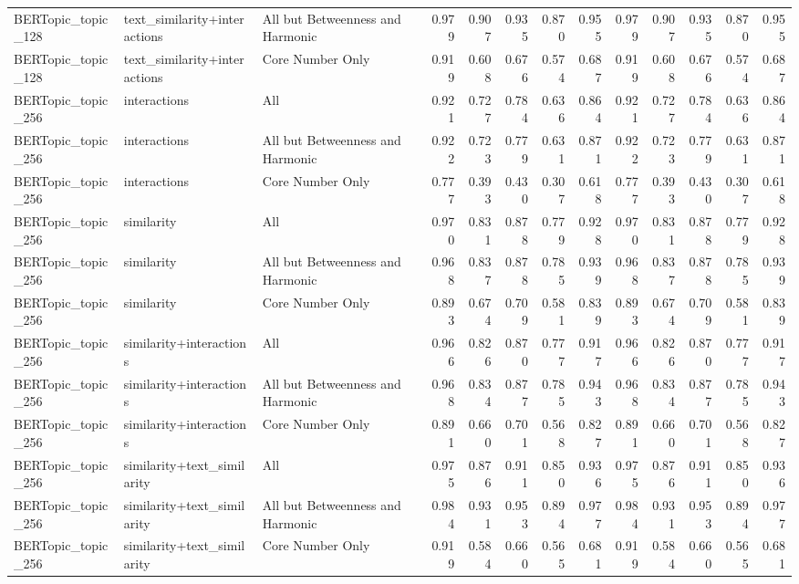\begin{tabular}{lllrrrrrrrrrr}
BERTopic\_topic\_128 & text\_similarity+interactions & All but Betweenness and Harmonic & 0.979 & 0.907 & 0.935 & 0.870 & 0.955 & 0.979 & 0.907 & 0.935 & 0.870 & 0.955 \\
BERTopic\_topic\_128 & text\_similarity+interactions & Core Number Only & 0.919 & 0.608 & 0.676 & 0.574 & 0.687 & 0.919 & 0.608 & 0.676 & 0.574 & 0.687 \\
BERTopic\_topic\_256 & interactions & All & 0.921 & 0.727 & 0.784 & 0.636 & 0.864 & 0.921 & 0.727 & 0.784 & 0.636 & 0.864 \\
BERTopic\_topic\_256 & interactions & All but Betweenness and Harmonic & 0.922 & 0.723 & 0.779 & 0.631 & 0.871 & 0.922 & 0.723 & 0.779 & 0.631 & 0.871 \\
BERTopic\_topic\_256 & interactions & Core Number Only & 0.777 & 0.393 & 0.430 & 0.307 & 0.618 & 0.777 & 0.393 & 0.430 & 0.307 & 0.618 \\
BERTopic\_topic\_256 & similarity & All & 0.970 & 0.831 & 0.878 & 0.779 & 0.928 & 0.970 & 0.831 & 0.878 & 0.779 & 0.928 \\
BERTopic\_topic\_256 & similarity & All but Betweenness and Harmonic & 0.968 & 0.837 & 0.878 & 0.785 & 0.939 & 0.968 & 0.837 & 0.878 & 0.785 & 0.939 \\
BERTopic\_topic\_256 & similarity & Core Number Only & 0.893 & 0.674 & 0.709 & 0.581 & 0.839 & 0.893 & 0.674 & 0.709 & 0.581 & 0.839 \\
BERTopic\_topic\_256 & similarity+interactions & All & 0.966 & 0.826 & 0.870 & 0.777 & 0.917 & 0.966 & 0.826 & 0.870 & 0.777 & 0.917 \\
BERTopic\_topic\_256 & similarity+interactions & All but Betweenness and Harmonic & 0.968 & 0.834 & 0.877 & 0.785 & 0.943 & 0.968 & 0.834 & 0.877 & 0.785 & 0.943 \\
BERTopic\_topic\_256 & similarity+interactions & Core Number Only & 0.891 & 0.660 & 0.701 & 0.568 & 0.827 & 0.891 & 0.660 & 0.701 & 0.568 & 0.827 \\
BERTopic\_topic\_256 & similarity+text\_similarity & All & 0.975 & 0.876 & 0.911 & 0.850 & 0.936 & 0.975 & 0.876 & 0.911 & 0.850 & 0.936 \\
BERTopic\_topic\_256 & similarity+text\_similarity & All but Betweenness and Harmonic & 0.984 & 0.931 & 0.953 & 0.894 & 0.977 & 0.984 & 0.931 & 0.953 & 0.894 & 0.977 \\
BERTopic\_topic\_256 & similarity+text\_similarity & Core Number Only & 0.919 & 0.584 & 0.660 & 0.565 & 0.681 & 0.919 & 0.584 & 0.660 & 0.565 & 0.681 \\

\end{tabular}
